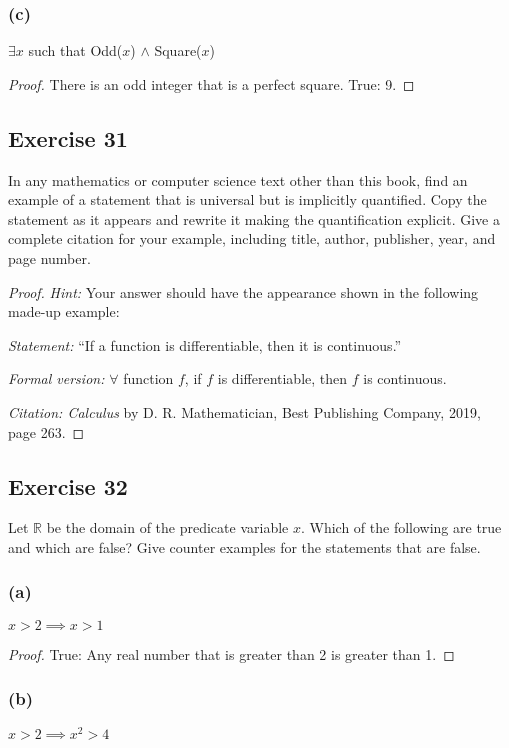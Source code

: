 \documentclass[14pt]{extarticle}
\newcommand{\R}{\mathbb{R}}
\newcommand{\fa}{\forall}
\newcommand{\te}{\exists}
\begin{document}
\subsubsection{(c)}
$\te x$ such that Odd($x$) $\wedge$ Square($x$)

\begin{proof}
    There is an odd integer that is a perfect square. True: 9.
\end{proof}

\subsection{Exercise 31}
In any mathematics or computer science text other than this book, find an example of a statement that is universal but is implicitly quantified. Copy the statement as it appears and rewrite it making the quantification explicit. Give a complete citation for your example, including title, author, publisher, year, and page number.

\begin{proof}
    {\it Hint:} Your answer should have the appearance shown in
    the following made-up example:

    {\it Statement:} “If a function is differentiable, then it is continuous.”

    {\it Formal version:} $\fa$ function $f$, if $f$ is differentiable, then $f$ is continuous.

        {\it Citation: Calculus} by D. R. Mathematician, Best Publishing Company, 2019, page 263.
\end{proof}

\subsection{Exercise 32}
Let $\R$ be the domain of the predicate variable $x$. Which of the following are true and which are false? Give counter examples for the statements that are false.

\subsubsection{(a)}
$x > 2 \implies x > 1$

\begin{proof}
    True: Any real number that is greater than 2 is greater than 1.
\end{proof}

\subsubsection{(b)}
$x > 2 \implies x^2 > 4$
\end{document}
